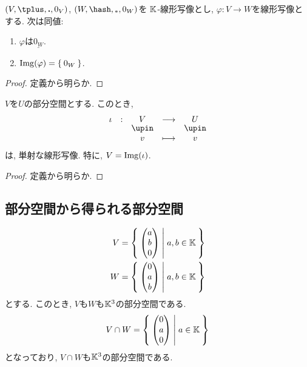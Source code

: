 \begin{prop}
  $(V,\plus,\act,0_V)$,
  $(W,\pplus,\aact,0_W)$を
  $\mathbb{K}$-線形写像とし,
  $\varphi\colon V\to W$を線形写像とする.
  次は同値:
  \begin{enumerate}
  \item $\varphi$は$\underline{0_W}$.
  \item $\operatorname{Img}(\varphi)=\Set{0_W}$.
  \end{enumerate}
\end{prop}
\begin{proof}
定義から明らか.
\end{proof}


\begin{prop}
  $V$を$U$の部分空間とする.
  このとき,
  \begin{align*}
    \shazo{\iota}{V}{U}
    {v}{v}
  \end{align*}
  は, 単射な線形写像.
  特に, $V= \operatorname{Img}(\iota)$.
\end{prop}
\begin{proof}
定義から明らか.
\end{proof}

\subsection{部分空間から得られる部分空間}
\label{sec:subspace:sub}

\begin{example}
  \begin{align*}
    V&=\Set{\begin{pmatrix}a\\b\\0\end{pmatrix}|a,b\in\mathbb{K}}\\
    W&=\Set{\begin{pmatrix}0\\a\\b\end{pmatrix}|a,b\in\mathbb{K}}
  \end{align*}
  とする.
  このとき, $V$も$W$も$\mathbb{K}^3$の部分空間である.
  \begin{align*}
    V\cap W&=\Set{\begin{pmatrix}0\\a\\0\end{pmatrix}|a\in\mathbb{K}}\\
  \end{align*}
  となっており, $V\cap W$も$\mathbb{K}^3$の部分空間である.
\end{example}

